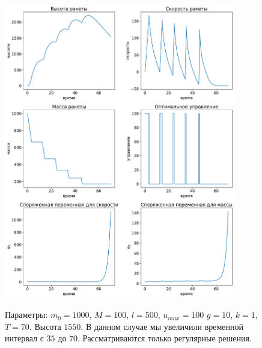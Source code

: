 \documentclass[12pt, a4paper]{article} %
\begin{document}
\begin{figure}[H]
\begin{center}
    \includegraphics[width=0.9\textwidth]{1_4.pdf}
    \label{fig:1_4}
    \caption{Параметры: $m_0=1000$, $M=100$,  $l=500$,  $u_{max}=100$
        $g=10$,  $k=1$,  $T=70$.
        Высота $1550$.
        В данном случае мы увеличили временной интервал с $35$ до  $70$.
        Рассматриваются только регулярные решения.}
\end{center} 
\end{figure}
\end{document}
